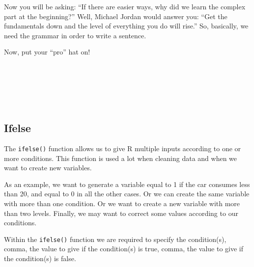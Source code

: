 \documentclass[
]{article}
\begin{document}
Now you will be asking: ``If there are easier ways, why did we learn the
complex part at the beginning?'' Well, Michael Jordan would answer you:
``Get the fundamentals down and the level of everything you do will
rise.'' So, basically, we need the grammar in order to write a sentence.

Now, put your ``pro'' hat on!

~

~

~

\hypertarget{ifelse}{%
\subsection{Ifelse}\label{ifelse}}

The \texttt{ifelse()} function allows us to give R multiple inputs according to
one or more conditions. This function is used a lot when cleaning data
and when we want to create new variables.

As an example, we want to generate a variable equal to 1 if the car
consumes less than 20, and equal to 0 in all the other cases. Or we can
create the same variable with more than one condition. Or we want to
create a new variable with more than two levels. Finally, we may want to
correct some values according to our conditions.

Within the \texttt{ifelse()} function we are required to specify the
condition(s), comma, the value to give if the condition(s) is true,
comma, the value to give if the condition(s) is false.
\end{document}
